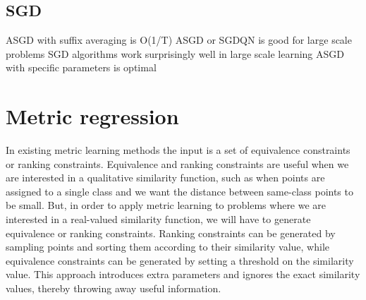 \documentclass[a4paper,titlepage]{article}
\begin{document}


\subsection{SGD}
 \cite{rakhlin2012making} ASGD with suffix averaging is O(1/T) \cite{bottou2010large} ASGD or SGDQN is good for large scale problems \cite{bottou2008tradeoffs} SGD algorithms work surprisingly well in large scale learning \cite{xu2011towards} ASGD with specific parameters is optimal

%

\pagebreak
\section{Metric regression}
\label{metric_regression}


In existing metric learning methods the input is a set of equivalence constraints or ranking constraints. Equivalence and ranking constraints are useful when we are interested in a qualitative similarity function, such as when points are assigned to a single class and we want the distance between same-class points to be small. But, in order to apply metric learning to problems where we are interested in a real-valued similarity function, we will have to generate equivalence or ranking constraints. Ranking constraints can be generated by sampling points and sorting them according to their similarity value, while equivalence constraints can be generated by setting a threshold on the similarity value. This approach introduces extra parameters and ignores the exact similarity values, thereby throwing away useful information.
\end{document}
